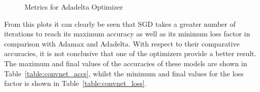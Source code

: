 \begin{figure}[!htb]
    \centering
    \begin{subfigure}[htb]{0.49\textwidth}
        \centering
    \end{subfigure}
    \hfill
    \begin{subfigure}[htb]{0.49\textwidth}
        \centering
    \end{subfigure}
    \caption{Metrics for Adadelta Optimizer}
    \label{fig:adadelta}
\end{figure}

From this plots it can clearly be seen that SGD takes a greater number of iterations to reach its maximum accuracy as well as its minimum loss factor in comparison with Adamax and Adadelta. With respect to their comparative accuracies, it is not conclusive that one of the optimizers provide a better result. The maximum and final values of the accuracies of these models are shown in Table~\ref{table:convnet_accs}, whilst the minimum and final values for the loss factor is shown in Table~\ref{table:convnet_loss}.

